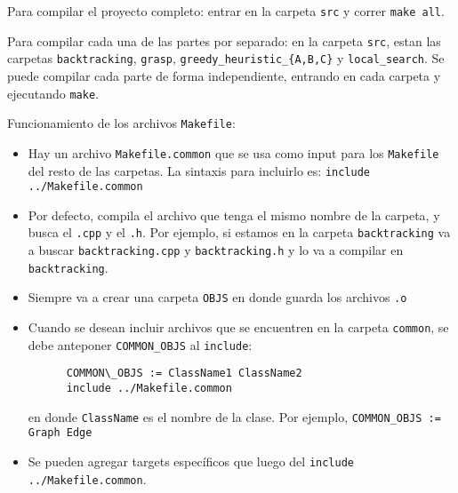 Para compilar el proyecto completo: entrar en la carpeta \texttt{src} y correr \texttt{make all}.

Para compilar cada una de las partes por separado: en la carpeta \texttt{src}, estan las carpetas \texttt{backtracking}, \texttt{grasp}, \texttt{greedy\_heuristic\_\{A,B,C\}} y \texttt{local\_search}. Se puede compilar cada parte de forma independiente, entrando en cada carpeta y ejecutando \texttt{make}. 

Funcionamiento de los archivos \texttt{Makefile}:

\begin{itemize}
    \item Hay un archivo \texttt{Makefile.common} que se usa como input para los \texttt{Makefile} del resto de las carpetas.
  La sintaxis para incluirlo es: \texttt{include ../Makefile.common}
  
  \item Por defecto, compila el archivo que tenga el mismo nombre de la carpeta, y busca el \texttt{.cpp} y el \texttt{.h}.
      Por ejemplo, si estamos en la carpeta \texttt{backtracking} va a buscar \texttt{backtracking.cpp} y \texttt{backtracking.h} y lo va a compilar en \texttt{backtracking}.
	  
  \item Siempre va a crear una carpeta \texttt{OBJS} en donde guarda los archivos \texttt{.o}
  
  \item Cuando se desean incluir archivos que se encuentren en la carpeta \texttt{common}, se debe anteponer \texttt{COMMON\_OBJS} al \texttt{include}:
  
  \begin{verbatim}
      COMMON\_OBJS := ClassName1 ClassName2
      include ../Makefile.common
  \end{verbatim}
  
  en donde \texttt{ClassName} es el nombre de la clase. Por ejemplo, \texttt{COMMON\_OBJS := Graph Edge}

  \item Se pueden agregar targets específicos que luego del \texttt{include ../Makefile.common}.
  
\end{itemize}
